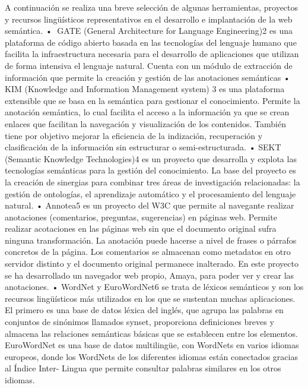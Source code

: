 A continuación se realiza una breve selección de algunas herramientas, proyectos y recursos lingüísticos representativos en el desarrollo e implantación de la web semántica.
• 􏰁GATE (General Architecture for Language Engineering)2 es una plataforma de código abierto basada en las tecnologías del lenguaje humano que facilita la infraestructura necesaria para el desarrollo de aplicaciones que utilizan de forma intensiva el lenguaje natural. Cuenta con un módulo de extracción de información que permite la creación y gestión de las anotaciones semánticas
• KIM (Knowledge and Information Management system) 3 es una plataforma extensible que se basa en la semántica para gestionar el conocimiento. Permite la anotación semántica, lo cual facilita el acceso a la información ya que se crean enlaces que facilitan la navegación y visualización de los contenidos. También tiene por objetivo mejorar la eficiencia de la indización, recuperación y clasificación de la información sin estructurar o semi-estructurada.
• SEKT (Semantic Knowledge Technologies)4 es un proyecto que desarrolla y explota las tecnologías semánticas para la gestión del conocimiento. La base del proyecto es la creación de sinergias para combinar tres áreas de investigación relacionadas: la gestión de ontologías, el aprendizaje automático y el procesamiento del lenguaje natural.
• Annotea5 es un proyecto del W3C que permite al navegante realizar anotaciones (comentarios, preguntas, sugerencias) en páginas web. Permite realizar acotaciones en las páginas web sin que el documento original sufra ninguna transformación. La anotación puede hacerse a nivel de frases o párrafos concretos de la página. Los comentarios se almacenan como metadatos en otro servidor distinto y el documento original permanece inalterado. En este proyecto se ha desarrollado un navegador web propio, Amaya, para poder ver y crear las anotaciones.
• WordNet y EuroWordNet6 se trata de léxicos semánticos y son los recursos lingüísticos más utilizados en los que se sustentan muchas aplicaciones. El primero es una base de datos léxica del inglés, que agrupa las palabras en conjuntos de sinónimos llamados synset, proporciona definiciones breves y almacena las relaciones semánticas básicas que se establecen entre los elementos. EuroWordNet es una base de datos multilingüe, con WordNets en varios idiomas europeos, donde los WordNets de los diferentes idiomas están conectados gracias al Índice Inter- Lingua que permite consultar palabras similares en los otros idiomas.

